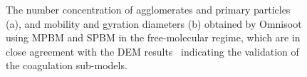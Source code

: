 \begin{figure}[H]
	\caption{The number concentration of agglomerates and primary particles (a), and mobility and gyration diameters (b) obtained by Omnisoot using MPBM and SPBM in the free-molecular regime, which are in close agreement with the DEM results~\citep{kholghy2021surface} indicating the validation of the coagulation sub-models.}
	\label{fig:coagvalid_Nd} 
\end{figure}


\begin{figure}[H]
	\centering
	\begin{subfigure}[t]{0.4\textwidth}
	\end{subfigure}
	\begin{subfigure}[t]{0.4\textwidth}
\end{subfigure}
\end{figure}
